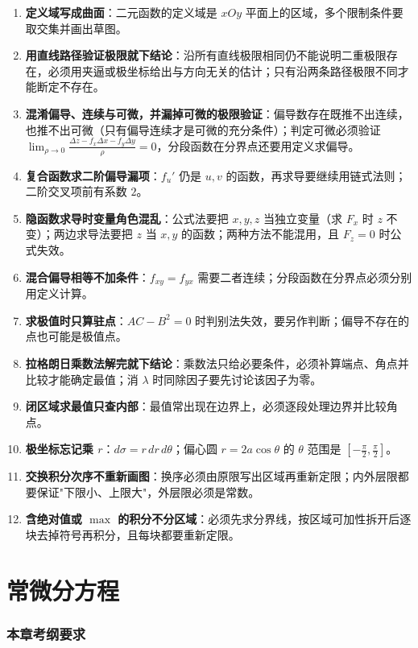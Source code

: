 \documentclass[11pt,openany,UTF8]{ctexbook}
\begin{document}
\begin{enumerate}
\item \textbf{定义域写成曲面}：二元函数的定义域是 $xOy$ 平面上的区域，多个限制条件要取交集并画出草图。
\item \textbf{用直线路径验证极限就下结论}：沿所有直线极限相同仍不能说明二重极限存在，必须用夹逼或极坐标给出与方向无关的估计；只有沿两条路径极限不同才能断定不存在。
\item \textbf{混淆偏导、连续与可微，并漏掉可微的极限验证}：偏导数存在既推不出连续，也推不出可微（只有偏导连续才是可微的充分条件）；判定可微必须验证 $\lim_{\rho\to 0}\frac{\Delta z-f_x\Delta x-f_y\Delta y}{\rho}=0$，分段函数在分界点还要用定义求偏导。
\item \textbf{复合函数求二阶偏导漏项}：$f_u'$ 仍是 $u,v$ 的函数，再求导要继续用链式法则；二阶交叉项前有系数 $2$。
\item \textbf{隐函数求导时变量角色混乱}：公式法要把 $x,y,z$ 当独立变量（求 $F_x$ 时 $z$ 不变）；两边求导法要把 $z$ 当 $x,y$ 的函数；两种方法不能混用，且 $F_z=0$ 时公式失效。
\item \textbf{混合偏导相等不加条件}：$f_{xy}=f_{yx}$ 需要二者连续；分段函数在分界点必须分别用定义计算。
\item \textbf{求极值时只算驻点}：$AC-B^{2}=0$ 时判别法失效，要另作判断；偏导不存在的点也可能是极值点。
\item \textbf{拉格朗日乘数法解完就下结论}：乘数法只给必要条件，必须补算端点、角点并比较才能确定最值；消 $\lambda$ 时同除因子要先讨论该因子为零。
\item \textbf{闭区域求最值只查内部}：最值常出现在边界上，必须逐段处理边界并比较角点。
\item \textbf{极坐标忘记乘 $r$}：$d\sigma=r\,dr\,d\theta$；偏心圆 $r=2a\cos\theta$ 的 $\theta$ 范围是 $\left[-\frac{\pi}{2},\frac{\pi}{2}\right]$。
\item \textbf{交换积分次序不重新画图}：换序必须由原限写出区域再重新定限；内外层限都要保证"下限小、上限大"，外层限必须是常数。
\item \textbf{含绝对值或 $\max$ 的积分不分区域}：必须先求分界线，按区域可加性拆开后逐块去掉符号再积分，且每块都要重新定限。
\end{enumerate}
\chapter{常微分方程}
\subsection*{本章考纲要求}
\end{document}
